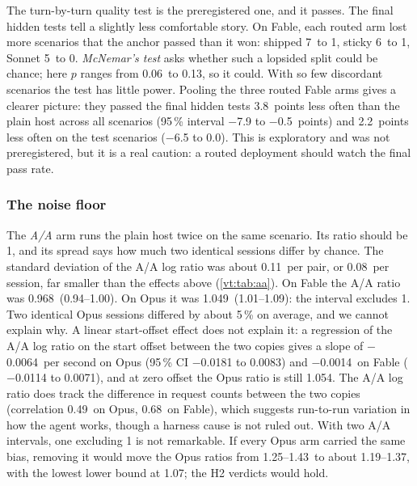 \documentclass[11pt,letterpaper]{article}
\newcommand{\term}[1]{\emph{#1}}
\newcommand{\AAAllSD}{0.11}
\newcommand{\AAAllSDSession}{0.08}
\newcommand{\AAFable}{0.968}
\newcommand{\AAFableCI}{0.94--1.00}
\newcommand{\AAOpus}{1.049}
\newcommand{\AAOpusCI}{1.01--1.09}
\newcommand{\AAOpusPct}{5}
\newcommand{\CfOpusSonnetPairTwo}{1.43}
\newcommand{\CfOpusStickyPairTwo}{1.25}
\newcommand{\FinalPoolAll}{3.8}
\newcommand{\FinalPoolAllCI}{$-$7.9 to $-$0.5}
\newcommand{\FinalPoolTest}{2.2}
\newcommand{\FinalPoolTestCI}{$-$6.5 to 0.0}
\newcommand{\OpusAdjHigh}{1.37}
\newcommand{\OpusAdjLow}{1.19}
\newcommand{\OpusAdjMinLower}{1.07}
\newcommand{\PassFableMaxP}{0.13}
\newcommand{\PassFableMinP}{0.06}
\newcommand{\PassFableShippedAnchorOnly}{7}
\newcommand{\PassFableShippedArmOnly}{1}
\newcommand{\PassFableSonnetAnchorOnly}{5}
\newcommand{\PassFableSonnetArmOnly}{0}
\newcommand{\PassFableStickyAnchorOnly}{6}
\newcommand{\PassFableStickyArmOnly}{1}
\newcommand{\RvAAInterceptOpus}{1.054}
\newcommand{\RvAAReqCorrFable}{0.68}
\newcommand{\RvAAReqCorrOpus}{0.49}
\newcommand{\RvAASlopeFable}{$-$0.0014}
\newcommand{\RvAASlopeFableCI}{$-$0.0114 to 0.0071}
\newcommand{\RvAASlopeOpus}{$-$0.0064}
\newcommand{\RvAASlopeOpusCI}{$-$0.0181 to 0.0083}
\begin{document}
The turn-by-turn quality test is the preregistered one, and it passes. The final hidden tests tell a
slightly less comfortable story. On Fable, each routed arm lost more scenarios that the anchor passed than
it won: shipped \PassFableShippedAnchorOnly\ to \PassFableShippedArmOnly, sticky
\PassFableStickyAnchorOnly\ to \PassFableStickyArmOnly, Sonnet \PassFableSonnetAnchorOnly\ to
\PassFableSonnetArmOnly. \term{McNemar's test} asks whether such a lopsided split could be chance; here
$p$ ranges from \PassFableMinP\ to \PassFableMaxP, so it could. With so few discordant scenarios the test has
little power. Pooling the three routed Fable arms gives a clearer picture: they passed the final hidden tests
\FinalPoolAll\ points less often than the plain host across all scenarios (95\,\% interval
\FinalPoolAllCI\ points) and \FinalPoolTest\ points less often on the test scenarios (\FinalPoolTestCI).
This is exploratory and was not preregistered, but it is a real caution: a routed deployment should watch the
final pass rate.

\subsubsection{The noise floor}\label{vt:sec:aa}

The \term{A/A} arm runs the plain host twice on the same scenario. Its ratio should be 1, and its spread
says how much two identical sessions differ by chance. The standard deviation of the A/A log ratio was about
\AAAllSD\ per pair, or \AAAllSDSession\ per session, far smaller than the effects above (\cref{vt:tab:aa}). On
Fable the A/A ratio was \AAFable\ (\AAFableCI). On Opus it was \AAOpus\ (\AAOpusCI): the interval excludes 1. Two identical Opus
sessions differed by about \AAOpusPct\,\% on average, and we cannot explain why. A linear start-offset effect does not explain it: a
regression of the A/A log ratio on the start offset between the two copies gives a slope of
\RvAASlopeOpus\ per second on Opus (95\,\% CI \RvAASlopeOpusCI) and \RvAASlopeFable\ on Fable (\RvAASlopeFableCI),
and at zero offset the Opus ratio is still \RvAAInterceptOpus. The A/A log ratio does track the difference in
request counts between the two copies (correlation \RvAAReqCorrOpus\ on Opus, \RvAAReqCorrFable\ on Fable), which
suggests run-to-run variation in how the agent works, though a harness cause is not ruled out. With two A/A intervals, one
excluding 1 is not remarkable. If every Opus arm carried the same bias, removing it would move the Opus ratios from
\CfOpusStickyPairTwo--\CfOpusSonnetPairTwo\ to about \OpusAdjLow--\OpusAdjHigh, with the lowest lower bound at
\OpusAdjMinLower; the H2 verdicts would hold.
\end{document}
